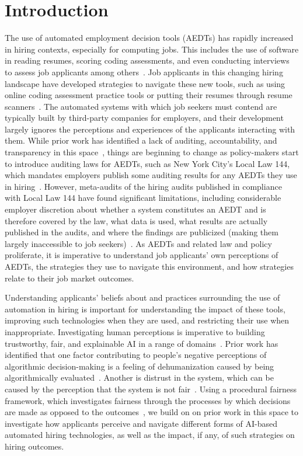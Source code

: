 \section{Introduction}
\label{sec:intro}

The use of automated employment decision tools (AEDTs) has rapidly increased in hiring contexts, especially for computing jobs. This includes the use of software in reading resumes, scoring coding assessments, and even conducting interviews to assess job applicants among others~\cite{bogen2018help, sanchez2020does}. Job applicants in this changing hiring landscape have developed strategies to navigate these new tools, such as using online coding assessment practice tools or putting their resumes through resume scanners~\cite{armstrong2023navigating}. The automated systems with which job seekers must contend are typically built by third-party companies for employers, and their development largely ignores the perceptions and experiences of the applicants interacting with them. While prior work has identified a lack of auditing, accountability, and transparency in this space~\cite{ajunwa2019auditing, sloane2022silicon, sanchez2020does}, things are beginning to change as policy-makers start to introduce auditing laws for AEDTs, such as New York City's Local Law 144, which mandates employers publish some auditing results for any AEDTs they use in hiring~\cite{locallaw144}. However, meta-audits of the hiring audits published in compliance with Local Law 144 have found significant limitations, including considerable employer discretion about whether a system constitutes an AEDT and is therefore covered by the law, what data is used, what results are actually published in the audits, and where the findings are publicized (making them largely inaccessible to job seekers)~\cite{wright2024null}. As AEDTs and related law and policy proliferate, it is imperative to understand job applicants' own perceptions of AEDTs, the strategies they use to navigate this environment, and how strategies relate to their job market outcomes.

Understanding applicants' beliefs about and practices surrounding the use of automation in hiring is important for understanding the impact of these tools, improving such technologies when they are used, and restricting their use when inappropriate. Investigating human perceptions is imperative to building trustworthy, fair, and explainable AI in a range of domains~\cite{woodruff2018qualitative, lee2018understanding, glikson2020human}. Prior work has identified that one factor contributing to people's negative perceptions of algorithmic decision-making is a feeling of dehumanization caused by being algorithmically evaluated~\cite{lee2018understanding}. Another is distrust in the system, which can be caused by the perception that the system is not fair~\cite{woodruff2018qualitative, lee2018understanding}. Using a procedural fairness framework, which investigates fairness through the processes by which decisions are made as opposed to the outcomes~\cite{lee2019procedural}, we build on on prior work in this space to investigate how applicants perceive and navigate different forms of AI-based automated hiring technologies, as well as the impact, if any, of such strategies on hiring outcomes. 

